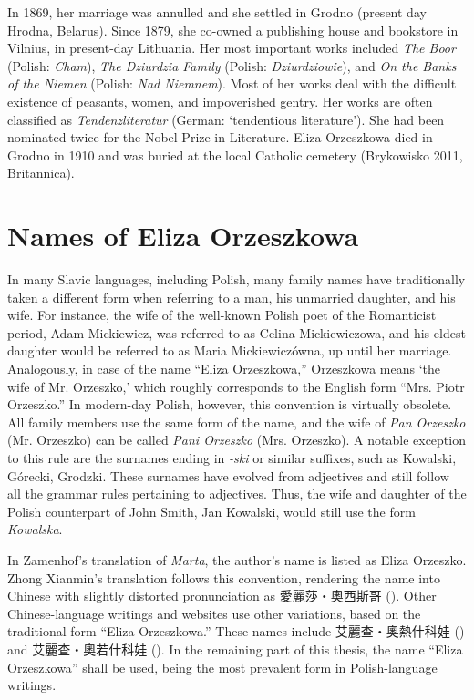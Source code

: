 In 1869, her marriage was annulled and she settled in Grodno (present day Hrodna, Belarus).
Since 1879, she co-owned a publishing house and bookstore in Vilnius, in present-day Lithuania.
Her most important works included \textit{The Boor} (Polish: \textit{Cham}), \textit{The Dziurdzia Family} (Polish: \textit{Dziurdziowie}), and \textit{On the Banks of the Niemen} (Polish: \textit{Nad Niemnem}).
Most of her works deal with the difficult existence of peasants, women, and impoverished gentry.
Her works are often classified as \textit{Tendenzliteratur} (German: `tendentious literature').
She had been nominated twice for the Nobel Prize in Literature.
Eliza Orzeszkowa died in Grodno in 1910 and was buried at the local Catholic cemetery
(Brykowisko 2011, Britannica).

\section{Names of Eliza Orzeszkowa}
In many Slavic languages, including Polish, many family names have traditionally taken a different form when referring to a man, his unmarried daughter, and his wife.
For instance, the wife of the well-known Polish poet of the Romanticist period, Adam Mickiewicz, was referred to as Celina Mickiewiczowa, and his eldest daughter would be referred to as Maria Mickiewiczówna, up until her marriage.
Analogously, in case of the name ``Eliza Orzeszkowa,'' Orzeszkowa means `the wife of Mr. Orzeszko,' which roughly corresponds to the English form ``Mrs. Piotr Orzeszko.''
In modern-day Polish, however, this convention is virtually obsolete.
All family members use the same form of the name, and the wife of \textit{Pan Orzeszko} (Mr. Orzeszko) can be called \textit{Pani Orzeszko} (Mrs. Orzeszko).
A notable exception to this rule are the surnames ending in \textit{-ski} or similar suffixes, such as Kowalski, Górecki, Grodzki.
These surnames have evolved from adjectives and still follow all the grammar rules pertaining to adjectives.
Thus, the wife and daughter of the Polish counterpart of John Smith, Jan Kowalski, would still use the form \textit{Kowalska}. 

In Zamenhof's translation of \textit{Marta}, the author's name is listed as Eliza Orzeszko.
Zhong Xianmin's translation follows this convention, rendering the name into Chinese with slightly distorted pronunciation as 愛麗莎・奧西斯哥 ().
Other Chinese-language writings and websites use other variations, based on the traditional form ``Eliza Orzeszkowa.''
These names include 艾麗查・奧熱什科娃 () and 艾麗查・奧若什科娃 (). In the remaining part of this thesis, the name ``Eliza Orzeszkowa'' shall be used, being the most prevalent form in Polish-language writings.

